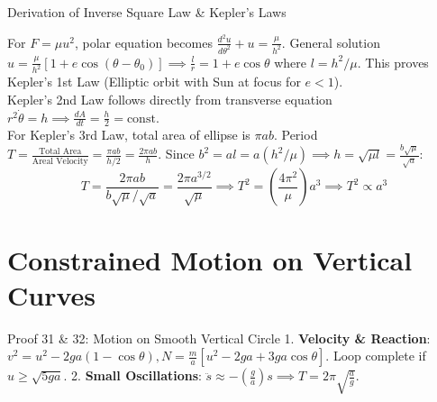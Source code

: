 \documentclass[11pt, a4paper]{report}
\begin{document}
\begin{proofbox}{Derivation of Inverse Square Law \& Kepler's Laws}
\begin{center}
\end{center}

For $F = \mu u^2$, polar equation becomes $\frac{d^2u}{d\theta^2} + u = \frac{\mu}{h^2}$. General solution $u = \frac{\mu}{h^2}[1 + e\cos(\theta - \theta_0)] \implies \frac{l}{r} = 1 + e\cos\theta$ where $l = h^2/\mu$. This proves Kepler's 1st Law (Elliptic orbit with Sun at focus for $e<1$).\\
Kepler's 2nd Law follows directly from transverse equation $r^2\dot{\theta} = h \implies \frac{dA}{dt} = \frac{h}{2} = \text{const}$.\\
For Kepler's 3rd Law, total area of ellipse is $\pi a b$. Period $T = \frac{\text{Total Area}}{\text{Areal Velocity}} = \frac{\pi a b}{h/2} = \frac{2\pi a b}{h}$.
Since $b^2 = a l = a(h^2/\mu) \implies h = \sqrt{\mu l} = \frac{b\sqrt{\mu}}{\sqrt{a}}$:
\[
T = \frac{2\pi a b}{b\sqrt{\mu}/\sqrt{a}} = \frac{2\pi a^{3/2}}{\sqrt{\mu}} \implies T^2 = \left(\frac{4\pi^2}{\mu}\right) a^3 \implies T^2 \propto a^3
\]
\end{proofbox}

\section{Constrained Motion on Vertical Curves}

\begin{theorembox}{Proof 31 \& 32: Motion on Smooth Vertical Circle}
1. \textbf{Velocity \& Reaction}: $v^2 = u^2 - 2ga(1-\cos\theta), N = \frac{m}{a}[u^2 - 2ga + 3ga\cos\theta]$. Loop complete if $u \ge \sqrt{5ga}$.
2. \textbf{Small Oscillations}: $\ddot{s} \approx -\left(\frac{g}{a}\right)s \implies T = 2\pi\sqrt{\frac{a}{g}}$.
\end{theorembox}
\end{document}
